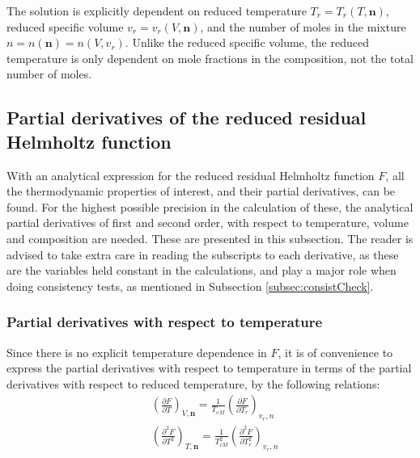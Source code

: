 \documentclass[internal,english]{sintefmemo2012}
\numberwithin{equation}{section}
\newcommand*{\pder}[2]{\left(\frac{\partial #1}{\partial #2}\right)}
\newcommand*{\pdder}[2]{\left(\frac{\partial^2 #1}{\partial #2^2}\right)}
\begin{document}
The solution is explicitly dependent on reduced temperature $T_r = T_r(T,\textbf{n})$, reduced specific volume $v_r = v_r(V,\textbf{n})$, and the number of moles in the mixture $n = n(\textbf{n}) = n(V,v_r)$. Unlike the reduced specific volume, the reduced temperature is only dependent on mole fractions in the composition, not the total number of moles.

\subsection{Partial derivatives of the reduced residual Helmholtz function}
With an analytical expression for the reduced residual Helmholtz function $F$, all the thermodynamic properties of interest, and their partial derivatives, can be found. For the highest possible precision in the calculation of these, the analytical partial derivatives of first and second order, with respect to temperature, volume and composition are needed. These are presented in this subsection. The reader is advised to take extra care in reading the subscripts to each derivative, as these are the variables held constant in the calculations, and play a major role when doing consistency tests, as mentioned in Subsection \ref{subsec:consistCheck}.

\subsubsection*{Partial derivatives with respect to temperature}
Since there is no explicit temperature dependence in $F$, it is of convenience to express the partial derivatives with respect to temperature in terms of the partial derivatives with respect to reduced temperature, by the following relations:
\begin{align}
\label{eq:F_T}
&\pder{F}{T}_{V, \textbf{n}} = \frac{1}{T_{cM}} \pder{F}{T_r}_{v_r, n} \\
\label{eq:F_TT}
& \pdder{F}{T}_{T,\textbf{n}} = \frac{1}{T_{cM} ^2} \pdder{F}{T_r}_{v_r, n}
\end{align}
\end{document}
